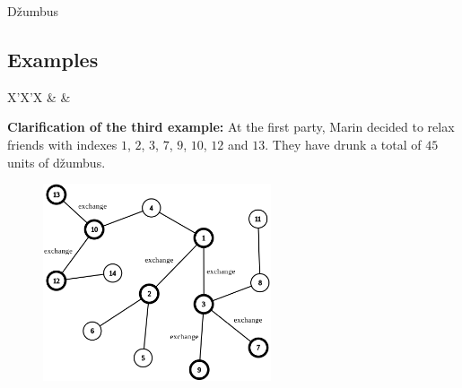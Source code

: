 \begin{statement}[
  problempoints=110,
  timelimit=1 second,
  memorylimit=512 MiB,
]{Džumbus}
\subsection*{Examples}
\begin{tabularx}{\textwidth}{X'X'X}
 &
 &
\end{tabularx}

\textbf{Clarification of the third example:}
At the first party, Marin decided to relax friends with indexes
$1$, $2$, $3$, $7$, $9$, $10$, $12$ and $13$. They have drunk a total
of $45$ units of džumbus.

\setlength\intextsep{-0.5cm}
\begin{figure}
\centering
\includegraphics[width=0.6\textwidth]{img/treeEnglishFixed.png}
\end{figure}

\end{statement}

